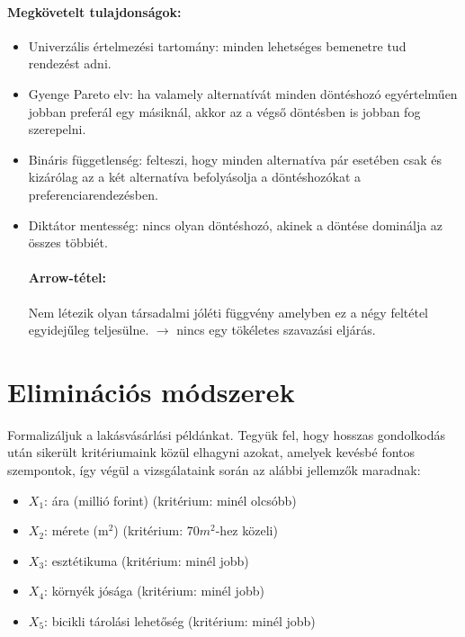 \documentclass[a4paper,12pt]{article}
\begin{document}
\paragraph{Megkövetelt tulajdonságok: }
\begin{itemize}
\item Univerzális értelmezési tartomány: minden lehetséges bemenetre tud rendezést adni.

\item Gyenge Pareto elv: ha valamely alternatívát minden döntéshozó egyértelműen jobban preferál egy másiknál, akkor az a végső döntésben is jobban fog szerepelni.

\item Bináris függetlenség: felteszi, hogy minden alternatíva pár esetében csak és kizárólag az a két alternatíva befolyásolja a döntéshozókat a preferenciarendezésben.

\item Diktátor mentesség: nincs olyan döntéshozó, akinek a döntése dominálja az összes többiét.

\paragraph{Arrow-tétel:}
Nem létezik olyan társadalmi jóléti függvény amelyben ez a négy feltétel egyidejűleg teljesülne. $\longrightarrow$ nincs egy tökéletes szavazási eljárás.

\end{itemize}



\section{Eliminációs módszerek}

Formalizáljuk a lakásvásárlási példánkat. Tegyük fel, hogy hosszas gondolkodás után sikerült kritériumaink közül elhagyni azokat, amelyek kevésbé fontos szempontok, így végül a vizsgálataink során az alábbi jellemzők maradnak: 

\begin{itemize}
\item $X_{1}$: ára (millió forint) (kritérium: minél olcsóbb)
\item $X_{2}$: mérete (m$^{2}$) (kritérium: $70m^2$-hez közeli)
\item $X_{3}$: esztétikuma (kritérium: minél jobb)
\item $X_{4}$: környék jósága (kritérium: minél jobb)
\item $X_{5}$: bicikli tárolási lehetőség (kritérium: minél jobb)

\end{itemize}
\end{document}
